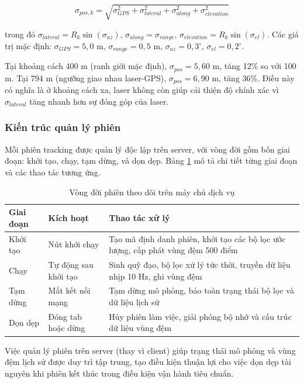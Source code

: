 \begin{equation}
\sigma_{pos,k} = \sqrt{\sigma_{GPS}^2 + \sigma_{lateral}^2 + \sigma_{along}^2 + \sigma_{elevation}^2}
\end{equation}

trong đó $\sigma_{lateral} = R_k \sin(\sigma_{az})$, $\sigma_{along} = \sigma_{range}$, $\sigma_{elevation} = R_k \sin(\sigma_{el})$. Các giá trị mặc định: $\sigma_{GPS} = 5,0$ m, $\sigma_{range} = 0,5$ m, $\sigma_{az} = 0,3^{\circ}$, $\sigma_{el} = 0,2^{\circ}$.

Tại khoảng cách 400 m (ranh giới mặc định), $\sigma_{pos} = 5,60$ m, tăng 12\% so với 100 m. Tại 794 m (ngưỡng giao nhau laser-GPS), $\sigma_{pos} = 6,90$ m, tăng 36\%. Điều này có nghĩa là ở khoảng cách xa, laser không còn giúp cải thiện độ chính xác vì $\sigma_{lateral}$ tăng nhanh hơn sự đóng góp của laser.

\subsubsection{Kiến trúc quản lý phiên}

\hspace{0.5cm} Mỗi phiên tracking được quản lý độc lập trên server, với vòng đời gồm bốn giai đoạn: khởi tạo, chạy, tạm dừng, và dọn dẹp. Bảng \ref{tab:server-session-lifecycle} mô tả chi tiết từng giai đoạn và các thao tác tương ứng.

\begin{table}[H]
\centering
\caption{Vòng đời phiên theo dõi trên máy chủ dịch vụ}
\label{tab:server-session-lifecycle}
\begin{tabularx}{\linewidth}{llX}
\toprule
\textbf{Giai đoạn} & \textbf{Kích hoạt} & \textbf{Thao tác xử lý} \\
\midrule
Khởi tạo & Nút khởi chạy & Tạo mã định danh phiên, khởi tạo các bộ lọc ước lượng, cấp phát vùng đệm 500 điểm \\
Chạy & Tự động sau khởi tạo & Sinh quỹ đạo, bộ lọc xử lý tức thời, truyền dữ liệu nhịp 10 Hz, ghi vùng đệm \\
Tạm dừng & Mất kết nối mạng & Tạm dừng mô phỏng, bảo toàn trạng thái bộ lọc và dữ liệu lịch sử \\
Dọn dẹp & Đóng tab hoặc dừng & Hủy phiên làm việc, giải phóng bộ nhớ và cấu trúc dữ liệu vùng đệm \\
\bottomrule
\end{tabularx}
\end{table}

Việc quản lý phiên trên server (thay vì client) giúp trạng thái mô phỏng và vùng đệm lịch sử được duy trì tập trung, tạo điều kiện thuận lợi cho việc dọn dẹp tài nguyên khi phiên kết thúc trong điều kiện vận hành tiêu chuẩn.

